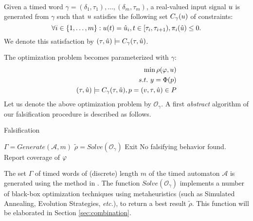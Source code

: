 Given a timed word $\gamma = (\delta_1, \tau_1), \ldots, (\delta_m, \tau_m)$, a real-valued input signal $u$ is generated from $\gamma$ such that $u$ satisfies the following set $C_{\gamma}(u)$ of constraints:
$$\forall i \in \{1, \ldots, m \}: u (t)= \hat{u}_i, t \in [\tau_i, \tau_{i+1}), \pi_i(\hat{u})  \le 0.$$
We denote this satisfaction by $(\tau, \hat{u}) \models C_{\gamma}(\tau, \hat{u})$.

The optimization problem becomes parameterized with $\gamma$:
\begin{eqnarray} \label{eq:optim2}
\min \rho(\varphi, u) \\ \nonumber
s.t. ~y=\Phi(p) \\ \nonumber
(\tau, \hat{u}) \models C_{\gamma}(\tau, \hat{u}), p = (v, \tau, \hat{u}) \in P \nonumber
\end{eqnarray}
Let us denote the above optimization problem by $\mathcal{O}_{\gamma}$. A first {\em abstract} algorithm of our falsification procedure is described as follows.
\begin{algorithm}
\caption{Falsification}
\begin{algorithmic}
		\State $\Gamma = Generate(\mathcal{A},m)$
	        \ForAll{$\gamma \in \Gamma$} 
		\State $\tilde{\rho} = Solve(\mathcal{O}_{\gamma})$
		  \State Exit	
		\EndIf
		\EndFor
		\State No falsifying behavior found. Report coverage of $\varphi$
\end{algorithmic}
\end{algorithm}
The set $\Gamma$ of timed words of (discrete) length $m$ of the timed automaton $\mathcal{A}$ is generated using the method in \cite{BBBK16}. The function $Solve(\mathcal{O}_{\gamma})$ implements a number of black-box optimization techniques using metaheuristics (such as Simulated Annealing, Evolution Strategies, {\it etc.}), to return a best result $\tilde{\rho}$. This function will be elaborated in Section \ref{sec:combination}.




